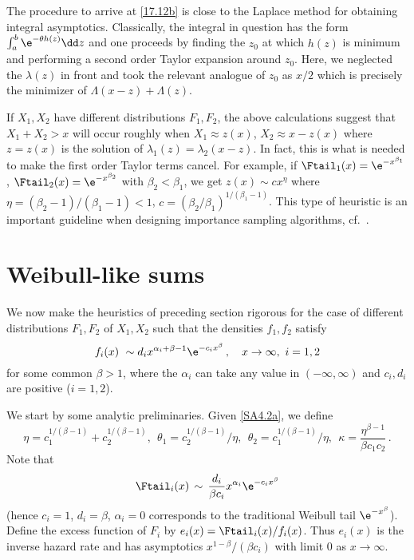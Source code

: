 \begin{remark}\label{Rem:17.12a}
The procedure to arrive at \eqref{17.12b} is close to the Laplace method for obtaining integral
asymptotics. Classically, the integral in question has the form $\int_a^b\e^{-\theta h(z)}\dd z$
and one proceeds by finding the $z_0$ at which $h(z)$ is minimum and performing a
second order Taylor expansion around $z_0$. Here, we neglected the   $\lambda(z)$  in front
and took the relevant analogue  of $z_0$ as $x/2$ which is precisely the minimizer
of $\Lambda(x-z)+\Lambda(z)$.
\remQED\end{remark}

\begin{remark}\label{Rem:17.12b} If $X_1,X_2$ have different distributions $F_1,F_2$, the
above calculations suggest that $X_1+X_2 > x$ will occur roughly when $X_1\approx z(x)$,
$X_2\approx x-z(x)$ where $z=z(x)$ is the solution of $\lambda_1(z)=\lambda_2(x-z)$.
In fact, this is what is needed to make the first order Taylor terms cancel. For example, if $\Ftail_1(x)=\e^{-x^{\beta_1}}$, $\Ftail_2(x)=\e^{-x^{\beta_2}}$
with $\beta_2<\beta_1$,
 we get $z(x)\sim cx^\eta$ where $\eta=(\beta_2-1)/(\beta_1-1)<1$,
 $c=(\beta_2/\beta_1)^{1/(\beta_1-1)}$. This type of heuristic is an
 important guideline when designing importance sampling algorithms,
 cf.~\cite[V.1,\,VI.2]{asmussen2007stochastic}.
\remQED\end{remark}

\section{Weibull-like sums}\label{S:Sums}

We now make the heuristics of preceding section rigorous for the case of
different distributions $F_1,F_2$ of $X_1,X_2$ such
that the densities $f_1,f_2$ satisfy
\begin{equation}\label{SA4.2a} f_i(x)\ \sim d_ix^{\alpha_i+\beta-1}\e^{-c_i x^\beta}\,,\quad x\to\infty,\ i=1,2
\end{equation}
for some common $\beta>1$, where the $\alpha_i$ can take any value in $(-\infty,\infty)$ and $c_i,d_i$ are positive ($i=1,2$).



We start by some analytic preliminaries. Given \eqref{SA4.2a}, we define
\begin{equation}\label{SA4.2aa}
\eta=c_1^{1/(\beta-1)}+c_2^{1/(\beta-1)},\ \
\theta_1=c_2^{1/(\beta-1)}/\eta,\ \ \theta_2=c_1^{1/(\beta-1)}/\eta,\ \
\kappa=\frac{\eta^{\beta-1}}{\beta c_1c_2}\,.
\end{equation}
Note that
\begin{equation}\label{9.11d}
\displaystyle \Ftail_i(x)\,\sim\,\frac{d_i}{\beta c_i}x^{\alpha_i}\e^{-c_i x^\beta}
\end{equation}
(hence $c_i=1$, $d_i=\beta$, $\alpha_i=0$ corresponds to the traditional Weibull tail $\e^{-x^\beta}$).
Define the excess function of $F_i$ by $e_i(x)=\Ftail_i(x)/f_i(x)$. Thus
$e_i(x)$ is the inverse hazard rate and has asymptotics $x^{1-\beta}/(\beta c_i) $ with limit 0 as $x\to\infty$.

